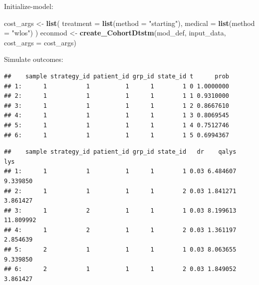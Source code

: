 \documentclass[
]{article}
\newenvironment{Shaded}{\begin{snugshade}}{\end{snugshade}}
\newcommand{\DataTypeTok}[1]{\textcolor[rgb]{0.13,0.29,0.53}{#1}}
\newcommand{\KeywordTok}[1]{\textcolor[rgb]{0.13,0.29,0.53}{\textbf{#1}}}
\newcommand{\NormalTok}[1]{#1}
\newcommand{\OperatorTok}[1]{\textcolor[rgb]{0.81,0.36,0.00}{\textbf{#1}}}
\newcommand{\OtherTok}[1]{\textcolor[rgb]{0.56,0.35,0.01}{#1}}
\newcommand{\StringTok}[1]{\textcolor[rgb]{0.31,0.60,0.02}{#1}}
\begin{document}
Initialize-model:

\begin{Shaded}
\begin{Highlighting}[]
\NormalTok{cost_args <-}\StringTok{ }\KeywordTok{list}\NormalTok{(}
  \DataTypeTok{treatment =} \KeywordTok{list}\NormalTok{(}\DataTypeTok{method =} \StringTok{"starting"}\NormalTok{),}
  \DataTypeTok{medical   =} \KeywordTok{list}\NormalTok{(}\DataTypeTok{method =} \StringTok{"wlos"}\NormalTok{)}
\NormalTok{)}
\NormalTok{econmod <-}\StringTok{ }\KeywordTok{create_CohortDtstm}\NormalTok{(mod_def, input_data, }\DataTypeTok{cost_args =}\NormalTok{ cost_args)}
\end{Highlighting}
\end{Shaded}

Simulate outcomes:

\begin{Shaded}
\end{Shaded}

\begin{verbatim}
##    sample strategy_id patient_id grp_id state_id t      prob
## 1:      1           1          1      1        1 0 1.0000000
## 2:      1           1          1      1        1 1 0.9310000
## 3:      1           1          1      1        1 2 0.8667610
## 4:      1           1          1      1        1 3 0.8069545
## 5:      1           1          1      1        1 4 0.7512746
## 6:      1           1          1      1        1 5 0.6994367
\end{verbatim}

\begin{Shaded}
\end{Shaded}

\begin{verbatim}
##    sample strategy_id patient_id grp_id state_id   dr    qalys       lys
## 1:      1           1          1      1        1 0.03 6.484607  9.339850
## 2:      1           1          1      1        2 0.03 1.841271  3.861427
## 3:      1           2          1      1        1 0.03 8.199613 11.809992
## 4:      1           2          1      1        2 0.03 1.361197  2.854639
## 5:      2           1          1      1        1 0.03 8.063655  9.339850
## 6:      2           1          1      1        2 0.03 1.849052  3.861427
\end{verbatim}
\end{document}
